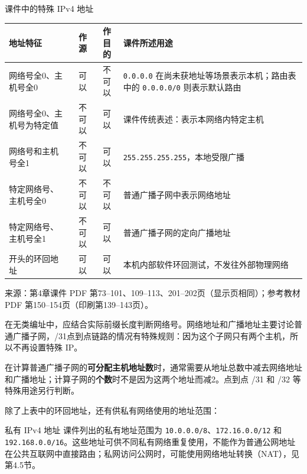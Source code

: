 \begin{proposition}{课件中的特殊 IPv4 地址}
\begin{center}\small\setlength{\tabcolsep}{4pt}
\begin{tabularx}{\textwidth}{>{\raggedright\arraybackslash}p{3.3cm}cc>{\raggedright\arraybackslash}X}
\toprule 地址特征 & 作源 & 作目的 & 课件所述用途\\\midrule
网络号全0、主机号全0 & 可以 & 不可以 & \texttt{0.0.0.0} 在尚未获地址等场景表示本机；路由表中的 \texttt{0.0.0.0/0} 则表示默认路由\\
网络号全0、主机号为特定值 & 不可以 & 可以 & 课件传统表述：表示本网络内特定主机\\
网络号和主机号全1 & 不可以 & 可以 & \texttt{255.255.255.255}，本地受限广播\\
特定网络号、主机号全0 & 不可以 & 不可以 & 普通广播子网中表示网络地址\\
特定网络号、主机号全1 & 不可以 & 可以 & 普通广播子网的定向广播地址\\
127 开头的环回地址 & 可以 & 可以 & 本机内部软件环回测试，不发往外部物理网络\\\bottomrule
\end{tabularx}\end{center}
\end{proposition}
\par\small\noindent 来源：第4章课件 PDF 第73--101、109--113、201--202页（显示页相同）；参考教材 PDF 第150--154页（印刷第139--143页）。\normalsize

\begin{remark}
在无类编址中，应结合实际前缀长度判断网络号。网络地址和广播地址主要讨论普通广播子网，/31点到点链路的情况有特殊规则：因为这个子网只有两个主机，所以不再设置特殊 IP。
\end{remark}
\begin{remark}
在计算普通广播子网的\textbf{可分配主机地址数}时，通常需要从地址总数中减去网络地址和广播地址；计算子网的\textbf{个数}时不是因为这两个地址而减2。点到点 /31 和 /32 等特殊用途另行判断。
\end{remark}

除了上表中的环回地址，还有供私有网络使用的地址范围：

\begin{definition}{私有 IPv4 地址}
课件列出的私有地址范围为 \texttt{10.0.0.0/8}、\texttt{172.16.0.0/12} 和 \texttt{192.168.0.0/16}。这些地址可供不同私有网络重复使用，不能作为普通公网地址在公共互联网中直接路由；私网访问公网时，可能使用网络地址转换（NAT），见第4.5节。
\end{definition}

